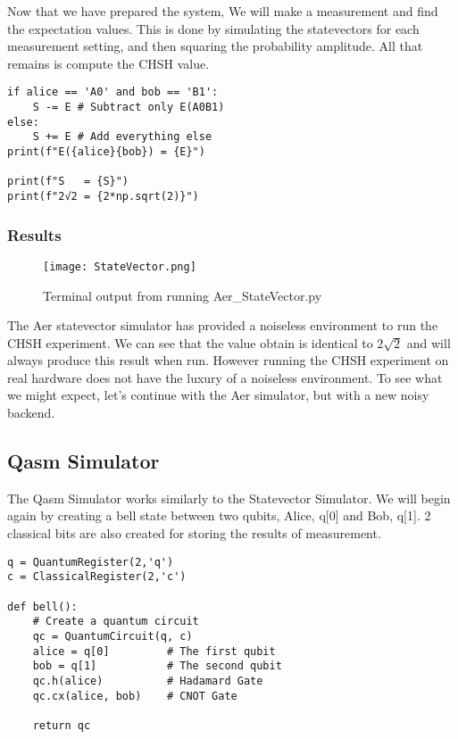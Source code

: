 \documentclass[12pt]{article}
\begin{document}
Now that we have prepared the system, We will make a measurement and find the expectation values. This is done by simulating the statevectors for each measurement setting, and then squaring the probability amplitude. All that remains is compute the CHSH value.

\begin{lstlisting}[style=python]
if alice == 'A0' and bob == 'B1':
    S -= E # Subtract only E(A0B1)
else:
    S += E # Add everything else
print(f"E({alice}{bob}) = {E}")

print(f"S   = {S}")
print(f"2√2 = {2*np.sqrt(2)}")
\end{lstlisting}

\subsubsection{Results}
\begin{figure}[h]
    \centering
    \texttt{[image: StateVector.png]}
    \caption{Terminal output from running Aer\_StateVector.py}
    \label{fig:StateVector_results}
\end{figure}

The Aer statevector simulator has provided a noiseless environment to run the CHSH experiment. We can see that the value obtain is identical to $2\sqrt{2}$ and will always produce this result when run. However running the CHSH experiment on real hardware does not have the luxury of a noiseless environment. To see what we might expect, let's continue with the Aer simulator, but with a new noisy backend.

\subsection{Qasm Simulator}

The Qasm Simulator works similarly to the Statevector Simulator. We will begin again by creating a bell state between two qubits, Alice, q[0] and Bob, q[1]. 2 classical bits are also created for storing the results of measurement. 

\begin{lstlisting}[style=python]
q = QuantumRegister(2,'q')
c = ClassicalRegister(2,'c')

def bell():
    # Create a quantum circuit
    qc = QuantumCircuit(q, c) 
    alice = q[0]         # The first qubit
    bob = q[1]           # The second qubit
    qc.h(alice)          # Hadamard Gate
    qc.cx(alice, bob)    # CNOT Gate
    
    return qc    
\end{lstlisting}
\end{document}
